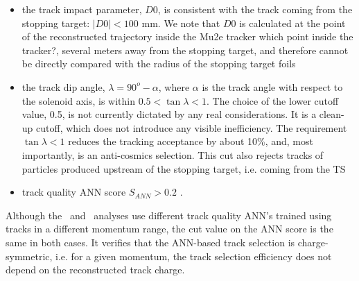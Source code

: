 \begin{itemize}
\item
  the track impact parameter, $D0$, is consistent with the track coming from the stopping target: 
  $|D0| < 100$ mm. We note that $D0$ is calculated at the point of the reconstructed trajectory 
  inside the Mu2e tracker {\blue which point inside the tracker?}, several meters away from the stopping target,
  and {\blue therefore} cannot be directly compared with the radius of the stopping target foils
\item 
  the track dip angle, $\lambda = 90^o - \alpha$, where $\alpha$ is the track angle with respect 
  to the solenoid axis, is within $ 0.5 < \tan{\lambda} < 1$. 
  The choice of the lower cutoff value, 0.5, is not currently dictated by any real considerations.
  It is a clean-up cutoff, which  {\blue does not} introduce any visible inefficiency. 
  The requirement $\tan{\lambda} < 1$ reduces the tracking acceptance by about 10\%, 
  and, most importantly, is an anti-cosmics selection. This cut also rejects tracks of particles 
  produced upstream of the stopping target, i.e. coming from the TS
\item
  track quality ANN score $S_{ANN} > 0.2$ {\blue .}
\end{itemize}

Although {\blue the} \MuToEm\ and \MuToEp\ analyses use different track quality ANN's trained using tracks in {\blue a} different
momentum range, the cut value  {\blue on} the ANN score  {\blue is the} same in both cases.
It  verifies that the ANN-based track selection is charge-symmetric, i.e. for a given momentum,
the track selection efficiency  {\blue does not} depend on the reconstructed track charge.
